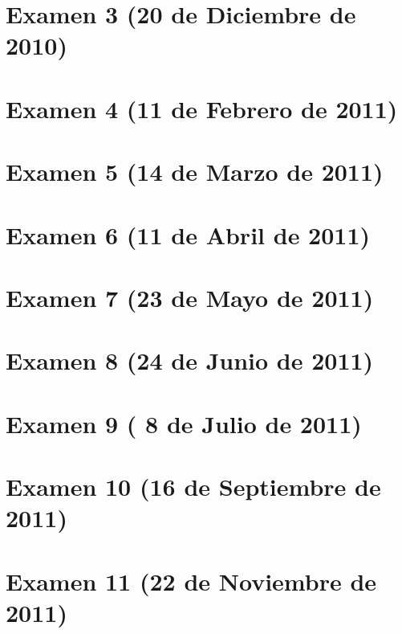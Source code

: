 \documentclass[a4paper,12pt,twoside]{book}
\begin{document}
\section{Examen 3 (20 de Diciembre de 2010)}
\section{Examen 4 (11 de Febrero de 2011)}
\label{examen_10_11_4_4}
\section{Examen 5 (14 de Marzo de 2011)}
\label{examen_10_11_4_5}
\section{Examen 6 (11 de Abril de 2011)}
\section{Examen 7 (23 de Mayo de 2011)}
\section{Examen 8 (24 de Junio de 2011)} 
\label{examen_10_11_4_8}
\section{Examen 9 ( 8 de Julio de 2011)} 
\label{examen_10_11_4_9}
\section{Examen 10 (16 de Septiembre de 2011)} 
\label{examen_10_11_4_10}
\section{Examen 11 (22 de Noviembre de 2011)} 
\label{examen_10_11_4_11}

\appendix %




\end{document}
